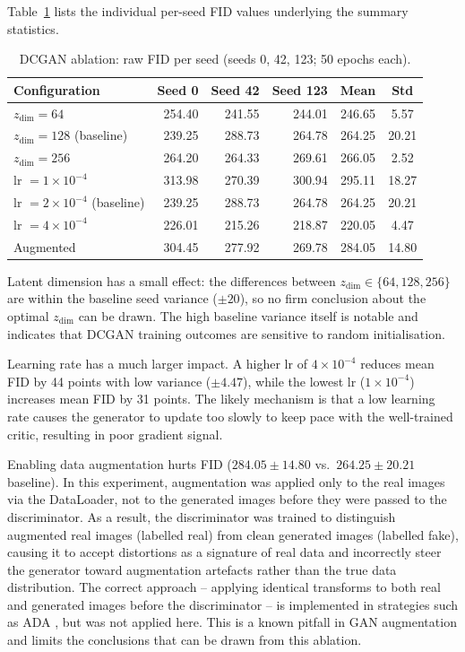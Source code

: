 \documentclass[12pt,a4paper]{article}
\begin{document}
Table~\ref{tab:dcgan_raw} lists the individual per-seed FID values underlying the
summary statistics.

\begin{table}[H]
  \centering
  \caption{DCGAN ablation: raw FID per seed (seeds 0, 42, 123; 50 epochs each).}
  \label{tab:dcgan_raw}
  \small
  \begin{tabular}{lrrrcc}
    \toprule
    Configuration & Seed 0 & Seed 42 & Seed 123 & Mean & Std \\
    \midrule
    $z_{\text{dim}}=64$              & 254.40 & 241.55 & 244.01 & 246.65 & 5.57 \\
    $z_{\text{dim}}=128$ (baseline)  & 239.25 & 288.73 & 264.78 & 264.25 & 20.21 \\
    $z_{\text{dim}}=256$             & 264.20 & 264.33 & 269.61 & 266.05 & 2.52 \\
    \midrule
    lr $= 1\times10^{-4}$            & 313.98 & 270.39 & 300.94 & 295.11 & 18.27 \\
    lr $= 2\times10^{-4}$ (baseline) & 239.25 & 288.73 & 264.78 & 264.25 & 20.21 \\
    lr $= 4\times10^{-4}$            & 226.01 & 215.26 & 218.87 & 220.05 & 4.47 \\
    \midrule
    Augmented                         & 304.45 & 277.92 & 269.78 & 284.05 & 14.80 \\
    \bottomrule
  \end{tabular}
\end{table}

Latent dimension has a small effect: the differences between
$z_{\text{dim}} \in \{64, 128, 256\}$ are within the baseline seed variance
($\pm20$), so no firm conclusion about the optimal $z_{\text{dim}}$ can be
drawn.  The high baseline variance itself is notable and indicates that DCGAN
training outcomes are sensitive to random initialisation.

Learning rate has a much larger impact.  A higher lr of $4\times10^{-4}$
reduces mean FID by 44 points with low variance ($\pm4.47$), while the lowest
lr ($1\times10^{-4}$) increases mean FID by 31 points.  The likely mechanism is
that a low learning rate causes the generator to update too slowly to keep pace
with the well-trained critic, resulting in poor gradient signal.

Enabling data augmentation hurts FID ($284.05 \pm 14.80$ vs.\ $264.25 \pm 20.21$
baseline).  In this experiment, augmentation was applied only to the real images
via the DataLoader, not to the generated images before they were passed to the
discriminator.  As a result, the discriminator was trained to distinguish
augmented real images (labelled real) from clean generated images (labelled fake),
causing it to accept distortions as a signature of real data and
incorrectly steer the generator toward augmentation artefacts rather than the
true data distribution.  The correct approach -- applying identical transforms to
both real and generated images before the discriminator -- is implemented in
strategies such as ADA \cite{karras2020training}, but was not applied here.
This is a known pitfall in GAN augmentation and limits the conclusions that can
be drawn from this ablation.
\end{document}
